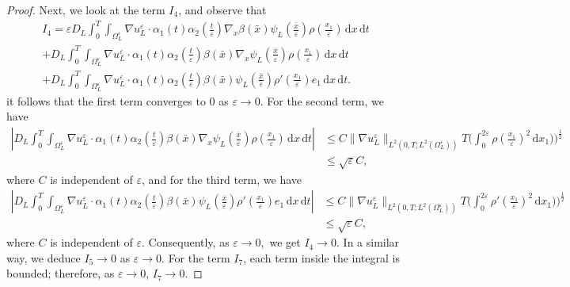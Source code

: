 \documentclass[11pt]{article}
\def\es{\varepsilon}
\def\oll{\Omega_L^\varepsilon}
\newcommand{\di}[1]{\,\mathrm{d}#1}
\begin{document}
\begin{proof}
Next, we look at the term $I_4$, and observe that
\begin{multline*}
  I_4
    =\es D_L\int_0^T\int_{\oll}\nabla u_L^\es \cdot \alpha_1(t)\alpha_2(\frac{t}{\es})  \nabla_{ x} \beta(\bar x) \psi_L(\frac{\bar x}{\es})\rho(\frac{x_1}{\es})   \di{x}\di{t}\\
    +D_L\int_0^T\int_{\oll}\nabla u_L^\es \cdot \alpha_1(t)\alpha_2(\frac{t}{\es})  \beta(\bar x)  \nabla_{ x}\psi_L(\frac{\bar x}{\es})\rho(\frac{x_1}{\es})   \di{x}\di{t}\\
    +D_L\int_0^T\int_{\oll}\nabla u_L^\es \cdot \alpha_1(t)\alpha_2(\frac{t}{\es})  \beta(\bar x)  \psi_L(\frac{\bar x}{\es})\rho'(\frac{x_1}{\es})e_1   \di{x}\di{t}.
\end{multline*}
it follows that the first term converges to $0$ as $\es\rightarrow0$. For the second term, we have
\begin{align*}
    \left|D_L\int_0^T\int_{\oll}\nabla u_L^\es \cdot \alpha_1(t)\alpha_2(\frac{t}{\es})  \beta(\bar x)  \nabla_{ x}\psi_L(\frac{\bar x}{\es})\rho(\frac{x_1}{\es})   \di{x}\di{t}\right|&\leq C \|\nabla u_L^\es\|_{L^2(0,T;L^2(\oll))}T\Big(\int_0^{2\es}\rho(\frac{x_1}{\es})^2\di{x_1})\Big)^{\frac{1}{2}}\\
    &\leq \sqrt{\es} C,
\end{align*}
where $C$ is independent of $\es$, and for the third term, we have
\begin{align*}
    \left|D_L\int_0^T\int_{\oll}\nabla u_L^\es \cdot \alpha_1(t)\alpha_2(\frac{t}{\es})  \beta(\bar x)  \psi_L(\frac{\bar x}{\es})\rho'(\frac{x_1}{\es}) e_1  \di{x}\di{t}\right|&\leq C \|\nabla u_L^\es\|_{L^2(0,T;L^2(\oll))}T\Big(\int_0^{2\es}\rho'(\frac{x_1}{\es})^2\di{x_1})\Big)^{\frac{1}{2}}\\
    &\leq \sqrt{\es} C,
\end{align*}
where $C$ is independent of $\es$. Consequently,  as $\es\rightarrow 0,$  we get $I_4\rightarrow 0.$ In a similar way, we deduce $I_5\rightarrow 0$ as $\es\rightarrow 0$. For the term $I_7$, each term inside the integral is bounded; therefore, as $\es\rightarrow 0$, $I_7\rightarrow 0$.


\end{proof}
\end{document}
